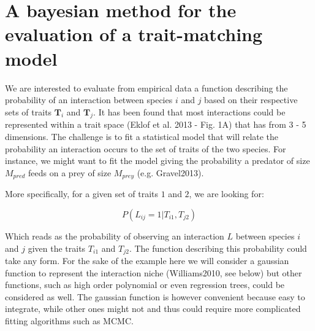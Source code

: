 \documentclass[11pt]{article}
\begin{document}
\section*{A bayesian method for the evaluation of a trait-matching model}

We are interested to evaluate from empirical data a function describing the probability of an interaction between species $i$ and $j$ based on their respective sets of traits $\mathbf{T}_i$ and $\mathbf{T}_j$. It has been found that most interactions could be represented within a trait space (Eklof et al. 2013 - Fig. 1A) that has from 3 - 5 dimensions. The challenge is to fit a statistical model that will relate the probability an interaction occurs to the set of traits of the two species. For instance, we might want to fit the model giving the probability a predator of size $M_{pred}$ feeds on a prey of size $M_{prey}$ (e.g. Gravel2013). 

More specifically, for a given set of traits $1$ and $2$, we are looking for:

\begin{equation}  
	P(L_{ij}=1|T_{i1},T_{j2})
\end{equation}

Which reads as the probability of observing an interaction $L$ between species $i$ and $j$ given the traits $T_{i1}$ and $T_{j2}$. The function describing this probability could take any form. For the sake of the example here we will consider a gaussian function to represent the interaction niche (Williams2010, see below) but other functions, such as high order polynomial or even regression trees, could be considered as well. The gaussian function is however convenient because easy to integrate, while other ones might not and thus could require more complicated fitting algorithms such as MCMC. 
\end{document}

